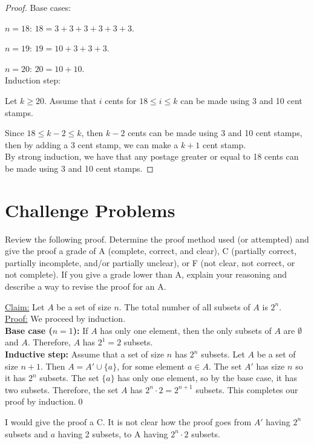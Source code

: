 \documentclass[12 pt]{exam}
\begin{document}
\begin{questions}
\begin{solution}
\begin{proof}
Base cases:

$n=18$: $18 = 3 + 3 + 3 + 3 + 3 + 3$.

$n=19$: $19 = 10 + 3 + 3 + 3$.

$n = 20$: $20 = 10 + 10$.\\

Induction step:

Let $k \ge 20$. Assume that $i$ cents for $18 \le i \le k$ can be made using 3 and 10 cent stamps.

Since $18 \le k-2 \le k$, then $k-2$ cents can be made using 3 and 10 cent stamps,
then by adding a 3 cent stamp, we can make a $k+1$ cent stamp.\\

By strong induction, we have that any postage greater or equal to 18 cents can be made using 3 and 10 cent
stamps.
\end{proof}\end{solution}


\newpage
\section*{Challenge Problems}


 \question  Review the following proof. Determine the proof method used (or attempted) and give the proof a grade of A (complete, correct, and clear), C (partially correct, partially incomplete, and/or partially unclear), or F (not clear, not correct, or not complete). If you give a grade lower than A, explain your reasoning and describe a way to revise the proof for an A. 

 \underline{Claim:} Let $A$ be a set of size $n$. The total number of all subsets of $A$ is $2^n$. \\
\underline{Proof:} We proceed by induction.\\
\textbf{Base case ($n = 1$):} If $A$ has only one element, then the only subsets of $A$ are $\emptyset$ and $A$. Therefore, $A$ has $2^1 = 2$ subsets.\\
\textbf{Inductive step:} Assume that a set of size $n$ has $2^n$ subsets. Let $A$ be a set of size $n + 1$. Then $A = A' \cup \{a\}$, for some element $a \in A$. The set $A'$ has size $n$ so it has $2^{n}$ subsets. The set $\{a\}$ has only one element, so by the base case, it has two subsets. Therefore, the set $A$ has $2^{n} \cdot 2 = 2^{n+1}$ subsets. This completes our proof by induction.\qed

\begin{solution}
I would give the proof a C. It is not clear how the proof goes from $A'$ having $2^n$ subsets
and ${a}$ having 2 subsets, to A having $2^n \cdot 2$ subsets.


\end{solution}
\end{questions}
\end{document}
